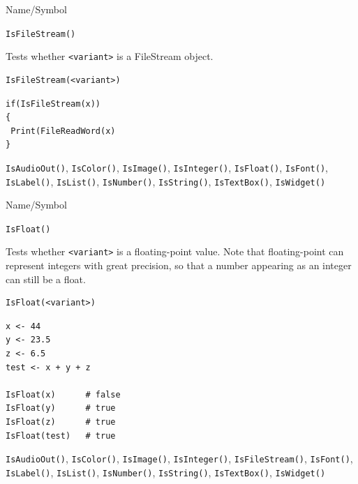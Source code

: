 \begin{desc}{Name/Symbol}
\item[Name/Symbol]	\verb+IsFileStream()+

\item[Description]	Tests whether \verb+<variant>+ is a FileStream object.

\item[Usage]		
\begin{verbatim}
IsFileStream(<variant>)
\end{verbatim}

\item[Example]
\begin{verbatim}
if(IsFileStream(x))
{
 Print(FileReadWord(x)
}
\end{verbatim}

\item[See Also] \verb+IsAudioOut()+, \verb+IsColor()+,
  \verb+IsImage()+, \verb+IsInteger()+, \verb+IsFloat()+,
  \verb+IsFont()+, \verb+IsLabel()+, \verb+IsList()+,
  \verb+IsNumber()+, \verb+IsString()+, \verb+IsTextBox()+,
  \verb+IsWidget()+
\end{desc}



\begin{desc}{Name/Symbol}
\item[Name/Symbol]	\verb+IsFloat()+

\item[Description] Tests whether \verb+<variant>+ is a floating-point
  value. Note that floating-point can represent integers with great
  precision, so that a number appearing as an integer can still be a
  float.

\item[Usage]
\begin{verbatim}
IsFloat(<variant>)
\end{verbatim}

\item[Example]
\begin{verbatim}
x <- 44
y <- 23.5
z <- 6.5
test <- x + y + z 

IsFloat(x)     	# false
IsFloat(y)     	# true
IsFloat(z)     	# true
IsFloat(test)  	# true
\end{verbatim}

\item[See Also] \verb+IsAudioOut()+, \verb+IsColor()+,
  \verb+IsImage()+, \verb+IsInteger()+, \verb+IsFileStream()+,
  \verb+IsFont()+, \verb+IsLabel()+, \verb+IsList()+,
  \verb+IsNumber()+, \verb+IsString()+, \verb+IsTextBox()+,
  \verb+IsWidget()+
\end{desc}



